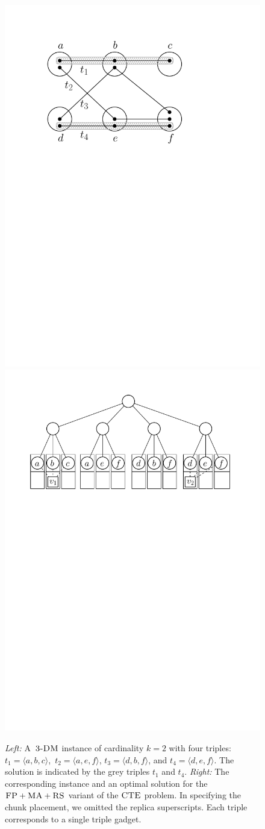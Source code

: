 \begin{figure}[t]
  \centering
\includegraphics[width = 0.31\columnwidth]{figs/static-mapping/tdp-example}
\hspace{1cm}
\centering
\includegraphics[width = 0.55\columnwidth]{figs/static-mapping/cte-ma}
\hfill
\caption{\textit{Left:} A~$\textsc{3-DM}$ instance of cardinality $k=2$ with four triples:
$t_1 = \langle a, b, c \rangle$,~$t_2 = \langle a, e, f \rangle$, $t_3 = \langle d, b, f \rangle$, and $t_4 = \langle d, e, f \rangle$. The solution is
indicated by the grey triples $t_1$ and $t_4$. \textit{Right:} The corresponding instance and an optimal solution for the~$\textsc{FP} + \textsc{MA}
+ \textsc{RS}$ variant of the $\textsc{CTE}$ problem. In specifying the chunk placement, we omitted the replica superscripts. Each triple corresponds to a single triple gadget.}
\hfill
\label{fig:fprsma}
\end{figure}

